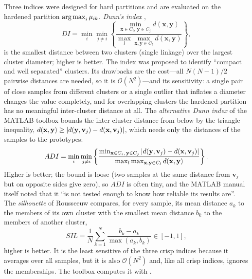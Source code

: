Three indices were designed for hard partitions and are evaluated on the hardened partition $\operatorname{arg\,max}_i\mu_{ik}$. \emph{Dunn's index} \cite{dunn:1974:validity},
\begin{equation}
  DI=\min_{i}\min_{j\ne i}\left\{\frac{\min_{\mathbf{x}\in C_i,\,\mathbf{y}\in C_j}d(\mathbf{x},\mathbf{y})}{\max_{l}\max_{\mathbf{x},\mathbf{y}\in C_l}d(\mathbf{x},\mathbf{y})}\right\},
  \label{eq:val:di}
\end{equation}
is the smallest distance between two clusters (single linkage) over the largest cluster diameter; higher is better. The index was proposed to identify ``compact and well separated'' clusters. Its drawbacks are the cost---all $N(N-1)/2$ pairwise distances are needed, so it is $\mathcal{O}(N^2)$---and its sensitivity: a single pair of close samples from different clusters or a single outlier that inflates a diameter changes the value completely, and for overlapping clusters the hardened partition has no meaningful inter-cluster distance at all. The \emph{alternative Dunn index} of the MATLAB toolbox bounds the inter-cluster distance from below by the triangle inequality, $d(\mathbf{x},\mathbf{y})\ge\left\lvert d(\mathbf{y},\mathbf{v}_j)-d(\mathbf{x},\mathbf{v}_j) \right\rvert$, which needs only the distances of the samples to the prototypes:
\begin{equation}
  ADI=\min_{i}\min_{j\ne i}\left\{\frac{\min_{\mathbf{x}\in C_i,\,\mathbf{y}\in C_j}\left\lvert d(\mathbf{y},\mathbf{v}_j)-d(\mathbf{x},\mathbf{v}_j) \right\rvert}{\max_{l}\max_{\mathbf{x},\mathbf{y}\in C_l}d(\mathbf{x},\mathbf{y})}\right\}.
  \label{eq:val:adi}
\end{equation}
Higher is better; the bound is loose (two samples at the same distance from $\mathbf{v}_j$ but on opposite sides give zero), so $ADI$ is often tiny, and the MATLAB manual itself noted that it ``is not tested enough to know how reliable its results are''. The \emph{silhouette} of Rousseeuw \cite{rousseeuw:1987:silhouette} compares, for every sample, its mean distance $a_k$ to the members of its own cluster with the smallest mean distance $b_k$ to the members of another cluster,
\begin{equation}
  SIL=\frac1N\sum_{k=1}^{N}\frac{b_k-a_k}{\max(a_k,b_k)}\in[-1,1],
  \label{eq:val:sil}
\end{equation}
higher is better. It is the least sensitive of the three crisp indices because it averages over all samples, but it is also $\mathcal{O}(N^2)$ and, like all crisp indices, ignores the memberships. The toolbox computes it with .


